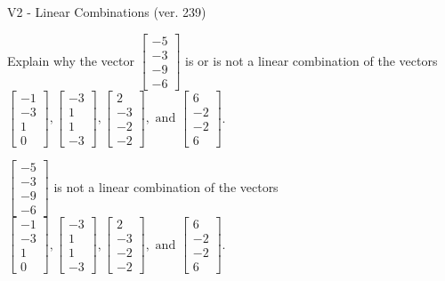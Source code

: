 \begin{exercise}
  \begin{exerciseTitle}V2 - Linear Combinations (ver. 239)\end{exerciseTitle}
  \begin{exerciseStatement}
    Explain why the vector \(\left[\begin{array}{c}
-5 \\
-3 \\
-9 \\
-6
\end{array}\right]\)  is or is not a linear 
	combination of the vectors \(\left[\begin{array}{c}
-1 \\
-3 \\
1 \\
0
\end{array}\right] , \left[\begin{array}{c}
-3 \\
1 \\
1 \\
-3
\end{array}\right] , \left[\begin{array}{c}
2 \\
-3 \\
-2 \\
-2
\end{array}\right] , \text{ and } \left[\begin{array}{c}
6 \\
-2 \\
-2 \\
6
\end{array}\right]\).
	


  \end{exerciseStatement}
  \begin{exerciseAnswer}
   \(\left[\begin{array}{c}
-5 \\
-3 \\
-9 \\
-6
\end{array}\right]\) 
  	 is not  
	a linear combination of the vectors \(\left[\begin{array}{c}
-1 \\
-3 \\
1 \\
0
\end{array}\right] , \left[\begin{array}{c}
-3 \\
1 \\
1 \\
-3
\end{array}\right] , \left[\begin{array}{c}
2 \\
-3 \\
-2 \\
-2
\end{array}\right] , \text{ and } \left[\begin{array}{c}
6 \\
-2 \\
-2 \\
6
\end{array}\right]\).


\end{exerciseAnswer}
\end{exercise}
